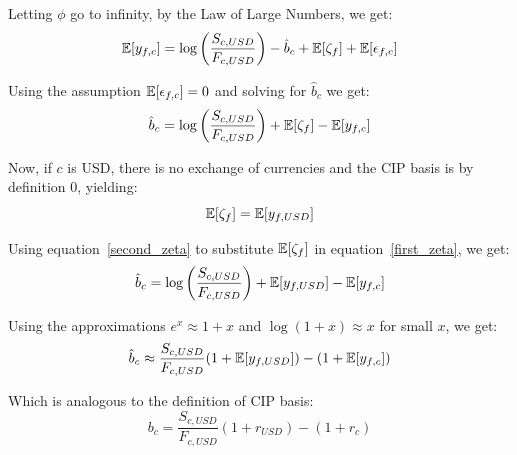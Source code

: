 \noindent Letting $\phi$ go to infinity, by the Law of Large Numbers, we get:
\begin{equation}
 \operatorname{\mathbb{E}}[ y_{f,c} ] =  \log\left(\frac{S_{c,USD}}{F_{c,USD}}\right) - \hat{b}_{c} 
+ \operatorname{\mathbb{E}}[ \zeta_{f} ]
+ \operatorname{\mathbb{E}}[ \epsilon_{f,c} ]
\end{equation}

\noindent Using the assumption $\operatorname{\mathbb{E}}[ \epsilon_{f,c} ]=0$ and solving for $\hat{b}_{c}$ we get:
\begin{equation}
  \label{first_zeta}
\hat{b}_{c} = \log\left(\frac{S_{c,USD}}{F_{c,USD}}\right) + \operatorname{\mathbb{E}}[ \zeta_{f} ] - \operatorname{\mathbb{E}}[ y_{f,c} ]
\end{equation}


Now, if $c$ is USD, there is no exchange of currencies and the CIP basis is by definition 0, yielding:
\begin{equation}
  \label{second_zeta}
\operatorname{\mathbb{E}}[ \zeta_{f} ] =  \operatorname{\mathbb{E}}[ y_{f,USD} ]
\end{equation}

\noindent Using equation~\eqref{second_zeta} to substitute $\operatorname{\mathbb{E}}[ \zeta_{f} ]$ in equation~\eqref{first_zeta}, we get:
\begin{equation}
 \hat{b}_{c} = \log\left(\frac{S_{c,USD}}{F_{c,USD}}\right) + \operatorname{\mathbb{E}}[ y_{f,USD} ] - \operatorname{\mathbb{E}}[ y_{f,c} ] 
\end{equation}

\noindent Using the approximations $e^x \approx 1+x$ and $\log(1+x) \approx x$ for small $x$, we get:
\begin{equation}
 \hat{b}_{c} \approx \frac{S_{c,USD}}{F_{c,USD}}(1 + \operatorname{\mathbb{E}}[ y_{f,USD} ]) - (1 + \operatorname{\mathbb{E}}[ y_{f,c} ]) 
\end{equation}



\noindent Which is analogous to the definition of CIP basis:
\begin{equation}
 b_{c} = \frac{S_{c,USD}}{F_{c,USD}}(1 + r_{USD}) - (1 + r_{c}) 
\end{equation}


